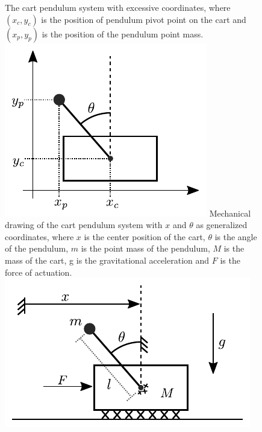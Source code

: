 \begin{figure}[H]
  \hspace{-10pt}
  \captionbox
  {
    The cart pendulum system with excessive coordinates, where $(x_c, y_c)$ is the position of pendulum pivot point on the cart and $(x_p, y_p)$ is the position of the pendulum point mass.
    \label{fig:excessiveCoordinates}
  }
  {
    \hspace{-1cm}
    \includegraphics[width=.4\textwidth]{figures/excessiveCoordinates}\vspace{-11pt}
  }
  \hspace{20pt}
  \captionbox 
  {
    Mechanical drawing of the cart pendulum system with $x$ and $\theta$ as generalized coordinates, where $x$ is the center position of the cart, $\theta$ is the angle of the pendulum, $m$ is the point mass of the pendulum, $M$ is the mass of the cart, g is the gravitational acceleration and $F$ is the force of actuation.
    \label{fig:mechanicalDrawing}
  }
  {
    \hspace{-1cm}
    \includegraphics[width=.5\textwidth]{figures/mechanicalDrawing}\vspace{6pt}
  }  
\end{figure}

